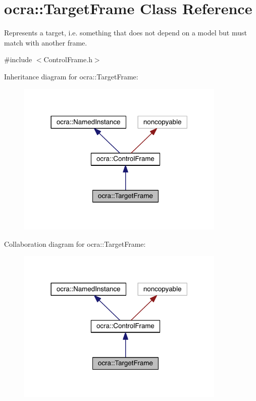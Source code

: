 \hypertarget{classocra_1_1TargetFrame}{}\section{ocra\+:\+:Target\+Frame Class Reference}
\label{classocra_1_1TargetFrame}


Represents a \textquotesingle{}target\textquotesingle{}, i.\+e. something that does not depend on a model but must match with another frame.  




{\ttfamily \#include $<$Control\+Frame.\+h$>$}



Inheritance diagram for ocra\+:\+:Target\+Frame\+:\nopagebreak
\begin{figure}[H]
\begin{center}
\leavevmode
\includegraphics[width=282pt]{df/d7d/classocra_1_1TargetFrame__inherit__graph}
\end{center}
\end{figure}


Collaboration diagram for ocra\+:\+:Target\+Frame\+:\nopagebreak
\begin{figure}[H]
\begin{center}
\leavevmode
\includegraphics[width=282pt]{df/d29/classocra_1_1TargetFrame__coll__graph}
\end{center}
\end{figure}
